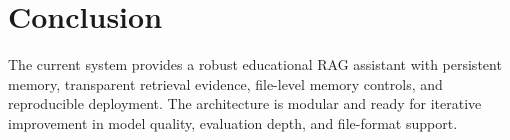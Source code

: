 \documentclass[11pt,a4paper]{article}
\begin{document}
\section{Conclusion}
The current system provides a robust educational RAG assistant with persistent memory, transparent retrieval evidence, file-level memory controls, and reproducible deployment. The architecture is modular and ready for iterative improvement in model quality, evaluation depth, and file-format support.
\end{document}
